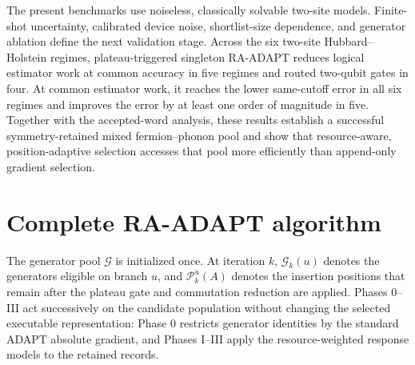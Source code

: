 \documentclass[
  reprint,
  amsmath,
  amssymb,
  aps,
  pra,
  nofootinbib,
  superscriptaddress,
  floatfix
]{revtex4-2}
\begin{document}
The present benchmarks use noiseless, classically solvable two-site models.
Finite-shot uncertainty, calibrated device noise, shortlist-size dependence,
and generator ablation define the next validation stage.
Across the six two-site Hubbard--Holstein regimes, plateau-triggered singleton
RA-ADAPT reduces logical estimator work at common accuracy in five regimes and
routed two-qubit gates in four. At common estimator work, it reaches the lower
same-cutoff error in all six regimes and improves the error by at least one
order of magnitude in five. Together with the accepted-word analysis, these
results establish a successful symmetry-retained mixed fermion--phonon pool
and show that resource-aware, position-adaptive selection accesses that pool
more efficiently than append-only gradient selection.

\clearpage
\appendix
\section{Complete RA-ADAPT algorithm}
\label{app:complete_algorithm}

The generator pool \(\mathcal G\) is initialized once. At iteration \(k\),
\(\mathcal G_k(u)\) denotes the generators eligible on branch \(u\), and
\(\mathcal P_k^u(A)\) denotes the insertion positions that remain after the
plateau gate and commutation reduction are applied. Phases 0--III act
successively on the candidate population without changing the selected
executable representation: Phase 0 restricts generator identities by the
standard ADAPT absolute gradient, and Phases I--III apply the resource-weighted
response models to the retained records.
\end{document}
